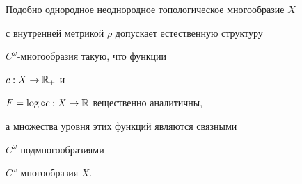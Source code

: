 \begin{thms}


\label{dif}


Подобно однородное неоднородное топологическое многообразие $X$


с внутренней метрикой $\rho$ допускает естественную структуру


$C^{\omega}$-многообразия такую, что функции


$c:X \rightarrow \Bbb{R}_{+}$ и


$F=\log\circ{c}:X \rightarrow \Bbb{R}$ вещественно аналитичны,


а множества уровня этих функций являются связными


$C^{\omega}$-подмногообразиями


$C^{\omega}$-многообразия $X$.


\end{thms}





